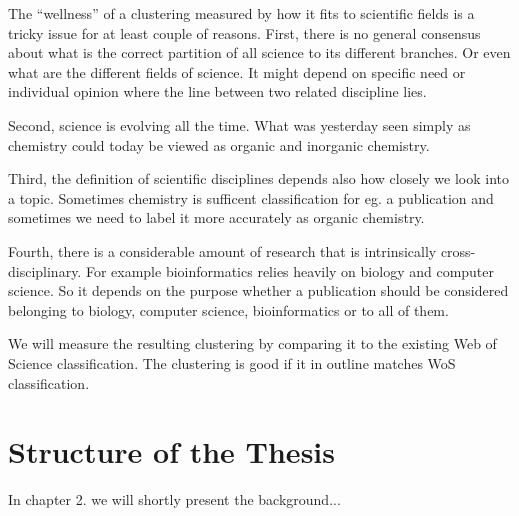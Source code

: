 The ``wellness'' of a clustering measured by how it fits to 
scientific fields is a tricky issue for at least couple of 
reasons.
First, there is no general consensus about what is the correct 
partition of all science to its different branches. Or even what
are the different fields of science. It might depend 
on specific need or individual opinion where the line between two 
related discipline lies.

Second, science is evolving all the time. What was yesterday seen 
simply as chemistry could today be viewed as organic and inorganic 
chemistry.

Third, the definition of scientific disciplines depends also how 
closely we look into a topic. Sometimes chemistry is sufficent 
classification for eg. a publication and sometimes we need to label 
it more accurately as organic chemistry.

Fourth, there is a considerable amount of research that is 
intrinsically cross-disciplinary. For example bioinformatics relies
heavily on biology and computer science. So it depends on the 
purpose whether a publication should be considered belonging to
biology, computer science, bioinformatics or to all of them.

We will measure the resulting clustering by comparing it to the
existing Web of Science classification. The clustering is good if
it in outline matches WoS classification.




\section{Structure of the Thesis}
\label{section:structure} 

In chapter 2. we will shortly present the background...
